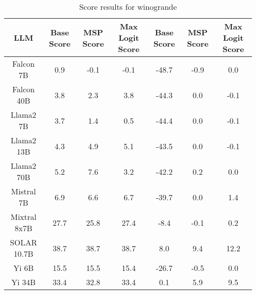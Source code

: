 \renewcommand\arraystretch{1.2}
\begin{table*}
\centering
\begin{tabular}{c|c|c|c|c|c|c}
LLM & Base Score & MSP Score & Max Logit Score & Base Score & MSP Score & Max Logit Score\\ \hline
Falcon 7B & 0.9 & -0.1 & -0.1 & -48.7 & -0.9 & 0.0\\
Falcon 40B & 3.8 & 2.3 & 3.8 & -44.3 & 0.0 & -0.1\\
Llama2 7B & 3.7 & 1.4 & 0.5 & -44.4 & 0.0 & -0.1\\
Llama2 13B & 4.3 & 4.9 & 5.1 & -43.5 & 0.0 & -0.1\\
Llama2 70B & 5.2 & 7.6 & 3.2 & -42.2 & 0.2 & 0.0\\
Mistral 7B & 6.9 & 6.6 & 6.7 & -39.7 & 0.0 & 1.4\\
Mixtral 8x7B & 27.7 & 25.8 & 27.4 & -8.4 & -0.1 & 0.2\\
SOLAR 10.7B & 38.7 & 38.7 & 38.7 & 8.0 & 9.4 & 12.2\\
Yi 6B & 15.5 & 15.5 & 15.4 & -26.7 & -0.5 & 0.0\\
Yi 34B & 33.4 & 32.8 & 33.4 & 0.1 & 5.9 & 9.5\\
\hline
\end{tabular}
\caption{Score results for winogrande}
\end{table*}
\label{tab:winogrande_score}
